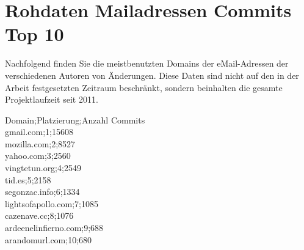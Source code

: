 \section*{Rohdaten Mailadressen Commits Top 10}

Nachfolgend finden Sie die meistbenutzten Domains der eMail-Adressen der verschiedenen Autoren von Änderungen. Diese Daten sind nicht auf den in der Arbeit festgesetzten Zeitraum beschränkt, sondern beinhalten die gesamte Projektlaufzeit seit 2011.

\noindent
Domain;Platzierung;Anzahl Commits \\
gmail.com;1;15608 \\
mozilla.com;2;8527 \\
yahoo.com;3;2560 \\
vingtetun.org;4;2549 \\
tid.es;5;2158 \\
segonzac.info;6;1334 \\
lightsofapollo.com;7;1085 \\
cazenave.cc;8;1076 \\
ardeenelinfierno.com;9;688 \\
arandomurl.com;10;680 \\